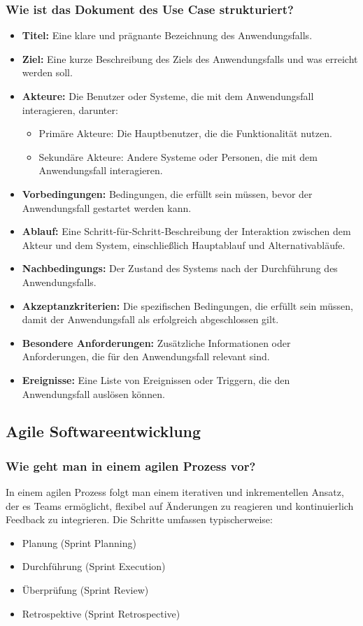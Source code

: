 \documentclass[main.tex]{subfiles}
\begin{document}
\subsubsection*{Wie ist das Dokument des \gls{Use Case} strukturiert?}
\begin{itemize}
    \item \textbf{Titel:} Eine klare und prägnante Bezeichnung des Anwendungsfalls.
    \item \textbf{Ziel:} Eine kurze Beschreibung des Ziels des Anwendungsfalls und was erreicht werden soll.
    \item \textbf{Akteure:} Die Benutzer oder Systeme, die mit dem Anwendungsfall interagieren, darunter:
    \begin{itemize}
        \item Primäre Akteure: Die Hauptbenutzer, die die Funktionalität nutzen.
        \item Sekundäre Akteure: Andere Systeme oder Personen, die mit dem Anwendungsfall interagieren.
    \end{itemize}
    \item \textbf{Vorbedingungen:} Bedingungen, die erfüllt sein müssen, bevor der Anwendungsfall gestartet werden kann.
    \item \textbf{Ablauf:} Eine Schritt-für-Schritt-Beschreibung der Interaktion zwischen dem Akteur und dem System, einschließlich Hauptablauf und Alternativabläufe.
    \item \textbf{\glspl{Nachbedingung}:} Der Zustand des Systems nach der Durchführung des Anwendungsfalls.
    \item \textbf{Akzeptanzkriterien:} Die spezifischen Bedingungen, die erfüllt sein müssen, damit der Anwendungsfall als erfolgreich abgeschlossen gilt.
    \item \textbf{Besondere Anforderungen:} Zusätzliche Informationen oder Anforderungen, die für den Anwendungsfall relevant sind.
    \item \textbf{Ereignisse:} Eine Liste von Ereignissen oder Triggern, die den Anwendungsfall auslösen können.
\end{itemize}

\subsection{Agile Softwareentwicklung}
\subsubsection*{Wie geht man in einem agilen Prozess vor?}
In einem agilen Prozess folgt man einem iterativen und inkrementellen Ansatz, der es Teams ermöglicht, flexibel auf Änderungen zu reagieren und kontinuierlich Feedback zu integrieren. Die Schritte umfassen typischerweise:
\begin{itemize}
    \item Planung (\gls{Sprint Planning})
    \item Durchführung (\gls{Sprint Execution})
    \item Überprüfung (\gls{Sprint Review})
    \item Retrospektive (\gls{Sprint Retrospective})
\end{itemize}
\end{document}
